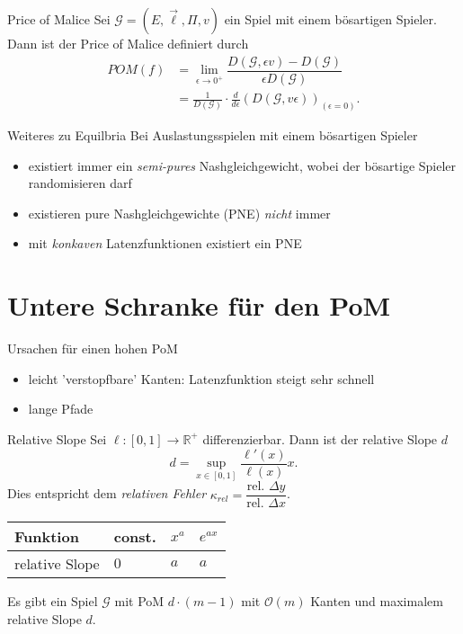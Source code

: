 \documentclass{beamer}
\begin{document}
\begin{frame}{Price of Malice}
	Sei $\mathcal G = (E, \vec{\ell}, \Pi, v)$ ein Spiel mit einem bösartigen Spieler.
	Dann ist der \alert{Price of Malice} definiert durch
	\begin{align*}
		POM(f) &= \lim_{\epsilon \to 0^+} \dfrac{D(\mathcal G, \epsilon v) - D(\mathcal G)}{\epsilon D(\mathcal G)}  \\
		&= \frac{1}{D(\mathcal G)} \cdot \frac{d}{d \epsilon}(D(\mathcal G, v \epsilon))_{(\epsilon = 0)}.
	\end{align*}
\end{frame}

\begin{frame}{Weiteres zu Equilbria}
	Bei Auslastungsspielen mit einem bösartigen Spieler 
	\begin{itemize}
		\item existiert immer ein \emph{semi-pures} Nashgleichgewicht, wobei der bösartige Spieler randomisieren darf
		\item existieren pure Nashgleichgewichte (PNE) \emph{nicht} immer
		\item mit \emph{konkaven} Latenzfunktionen existiert ein PNE
	\end{itemize}
\end{frame}

\section{Untere Schranke für den PoM}

\begin{frame}{Ursachen für einen hohen PoM}
	\begin{itemize}
		\item leicht 'verstopfbare' Kanten: Latenzfunktion steigt sehr schnell
		\item lange Pfade
	\end{itemize}
\end{frame}

\begin{frame}{Relative Slope}
	Sei $\ell : [0,1] \to \mathbb R^+$ differenzierbar.
	Dann ist der \alert{relative Slope} $d$
	\[ d = \sup_{x \in [0,1]} \dfrac{\ell'(x)}{\ell(x)} x .\]
	Dies entspricht dem \emph{relativen Fehler} $\kappa_{rel} = \dfrac{\text{rel. } \Delta y}{\text{rel. } \Delta x}$.
	
	\begin{table}[]
		\begin{tabular}{@{}llll@{}}
			\toprule
			Funktion       & const. & $x^a$ & $e^{ax}$ \\ \midrule
			relative Slope & $0$      & $a$     & $a$        \\ \bottomrule
		\end{tabular}
	\end{table}
	\pause
	\begin{theorem}
		Es gibt ein Spiel $\mathcal G$ mit \alert{PoM $d \cdot (m-1)$} mit $\mathcal O(m)$ Kanten und maximalem relative Slope $d$.
	\end{theorem}
\end{frame}
\end{document}
